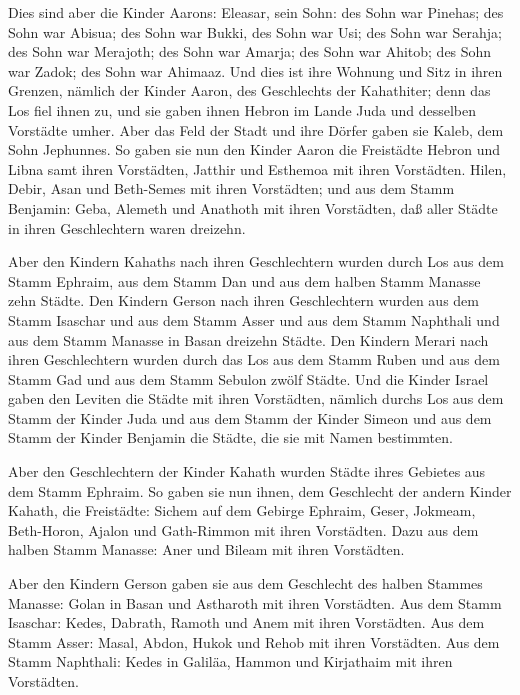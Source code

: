  Dies sind aber die Kinder Aarons: Eleasar, sein Sohn: des
Sohn war Pinehas; des Sohn war Abisua;  des Sohn war Bukki,
des Sohn war Usi; des Sohn war Serahja;  des Sohn war
Merajoth; des Sohn war Amarja; des Sohn war Ahitob;  des
Sohn war Zadok; des Sohn war Ahimaaz.  Und dies ist ihre
Wohnung und Sitz in ihren Grenzen, nämlich der Kinder Aaron, des
Geschlechts der Kahathiter; denn das Los fiel ihnen zu, 
und sie gaben ihnen Hebron im Lande Juda und desselben Vorstädte umher.
 Aber das Feld der Stadt und ihre Dörfer gaben sie Kaleb,
dem Sohn Jephunnes.  So gaben sie nun den Kinder Aaron die
Freistädte Hebron und Libna samt ihren Vorstädten, Jatthir und Esthemoa
mit ihren Vorstädten.  Hilen, Debir,  Asan und
Beth-Semes mit ihren Vorstädten;  und aus dem Stamm
Benjamin: Geba, Alemeth und Anathoth mit ihren Vorstädten, daß aller
Städte in ihren Geschlechtern waren dreizehn.

 Aber den Kindern Kahaths nach ihren Geschlechtern wurden
durch Los aus dem Stamm Ephraim, aus dem Stamm Dan und aus dem halben
Stamm Manasse zehn Städte.  Den Kindern Gerson nach ihren
Geschlechtern wurden aus dem Stamm Isaschar und aus dem Stamm Asser und
aus dem Stamm Naphthali und aus dem Stamm Manasse in Basan dreizehn
Städte.  Den Kindern Merari nach ihren Geschlechtern wurden
durch das Los aus dem Stamm Ruben und aus dem Stamm Gad und aus dem
Stamm Sebulon zwölf Städte.  Und die Kinder Israel gaben
den Leviten die Städte mit ihren Vorstädten,  nämlich
durchs Los aus dem Stamm der Kinder Juda und aus dem Stamm der Kinder
Simeon und aus dem Stamm der Kinder Benjamin die Städte, die sie mit
Namen bestimmten.

 Aber den Geschlechtern der Kinder Kahath wurden Städte
ihres Gebietes aus dem Stamm Ephraim.  So gaben sie nun
ihnen, dem Geschlecht der andern Kinder Kahath, die Freistädte: Sichem
auf dem Gebirge Ephraim, Geser,  Jokmeam, Beth-Horon,
 Ajalon und Gath-Rimmon mit ihren Vorstädten. 
Dazu aus dem halben Stamm Manasse: Aner und Bileam mit ihren Vorstädten.

 Aber den Kindern Gerson gaben sie aus dem Geschlecht des
halben Stammes Manasse: Golan in Basan und Astharoth mit ihren
Vorstädten.  Aus dem Stamm Isaschar: Kedes, Dabrath,
 Ramoth und Anem mit ihren Vorstädten.  Aus
dem Stamm Asser: Masal, Abdon,  Hukok und Rehob mit ihren
Vorstädten.  Aus dem Stamm Naphthali: Kedes in Galiläa,
Hammon und Kirjathaim mit ihren Vorstädten.


